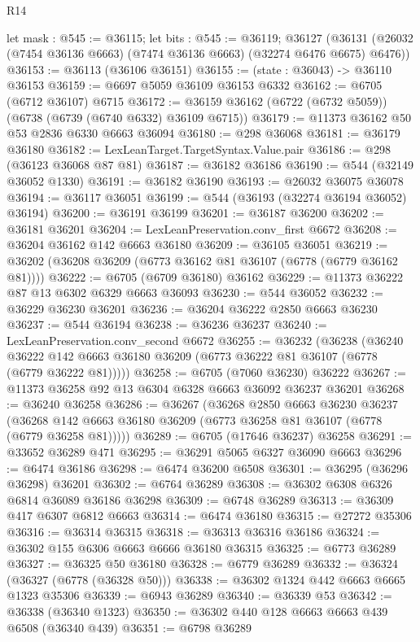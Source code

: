 \begin{lexlean}{R14}
\begin{coremodule}
  let mask : @545 := @36115;
  let bits : @545 := @36119;
  @36127 (@36131 (@26032 (@7454 @36136 @6663) (@7474 @36136 @6663) (@32274 @6476 @6675) @6476))
@36153 := @36113 (@36106 @36151)
@36155 := (state : @36043) -> @36110 @36153
@36159 := @6697 @5059 @36109 @36153 @6332
@36162 := @6705 (@6712 @36107) @6715
@36172 := @36159 @36162 (@6722 (@6732 @5059)) (@6738 (@6739 (@6740 @6332) @36109 @6715))
@36179 := @11373 @36162 @50 @53 @2836 @6330 @6663 @36094
@36180 := @298 @36068
@36181 := @36179 @36180
@36182 := LexLeanTarget.TargetSyntax.Value.pair
@36186 := @298 (@36123 @36068 @87 @81)
@36187 := @36182 @36186
@36190 := @544 (@32149 @36052 @1330)
@36191 := @36182 @36190
@36193 := @26032 @36075 @36078
@36194 := @36117 @36051
@36199 := @544 (@36193 (@32274 @36194 @36052) @36194)
@36200 := @36191 @36199
@36201 := @36187 @36200
@36202 := @36181 @36201
@36204 := LexLeanPreservation.conv_first @6672
@36208 := @36204 @36162 @142 @6663 @36180
@36209 := @36105 @36051
@36219 := @36202 (@36208 @36209 (@6773 @36162 @81 @36107 (@6778 (@6779 @36162 @81))))
@36222 := @6705 (@6709 @36180) @36162
@36229 := @11373 @36222 @87 @13 @6302 @6329 @6663 @36093
@36230 := @544 @36052
@36232 := @36229 @36230 @36201
@36236 := @36204 @36222 @2850 @6663 @36230
@36237 := @544 @36194
@36238 := @36236 @36237
@36240 := LexLeanPreservation.conv_second @6672
@36255 := @36232
    (@36238
      (@36240 @36222 @142 @6663 @36180 @36209 (@6773 @36222 @81 @36107 (@6778 (@6779 @36222 @81)))))
@36258 := @6705 (@7060 @36230) @36222
@36267 := @11373 @36258 @92 @13 @6304 @6328 @6663 @36092 @36237 @36201
@36268 := @36240 @36258
@36286 := @36267
    (@36268
      @2850
      @6663
      @36230
      @36237
      (@36268 @142 @6663 @36180 @36209 (@6773 @36258 @81 @36107 (@6778 (@6779 @36258 @81)))))
@36289 := @6705 (@17646 @36237) @36258
@36291 := @33652 @36289 @471
@36295 := @36291 @5065 @6327 @36090 @6663
@36296 := @6474 @36186
@36298 := @6474 @36200 @6508
@36301 := @36295 (@36296 @36298) @36201
@36302 := @6764 @36289
@36308 := @36302 @6308 @6326 @6814 @36089 @36186 @36298
@36309 := @6748 @36289
@36313 := @36309 @417 @6307 @6812 @6663
@36314 := @6474 @36180
@36315 := @27272 @35306
@36316 := @36314 @36315
@36318 := @36313 @36316 @36186
@36324 := @36302 @155 @6306 @6663 @6666 @36180 @36315
@36325 := @6773 @36289
@36327 := @36325 @50 @36180
@36328 := @6779 @36289
@36332 := @36324 (@36327 (@6778 (@36328 @50)))
@36338 := @36302 @1324 @442 @6663 @6665 @1323 @35306
@36339 := @6943 @36289
@36340 := @36339 @53
@36342 := @36338 (@36340 @1323)
@36350 := @36302 @440 @128 @6663 @6663 @439 @6508 (@36340 @439)
@36351 := @6798 @36289

\end{coremodule}
\end{lexlean}
